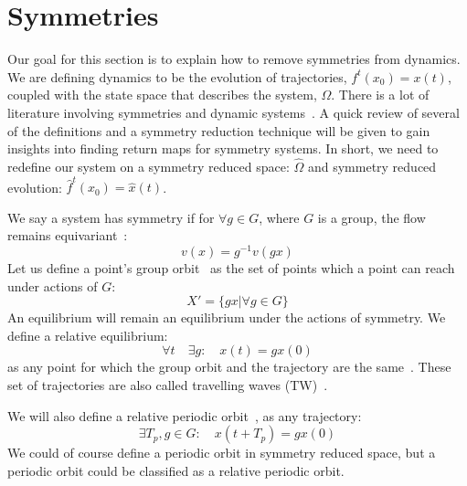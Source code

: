 \documentclass[12 pt]{article}
\begin{document}
\section{Symmetries}
\label{sec:Symm}
Our goal for this section is to explain how to remove symmetries from
dynamics.  We are defining dynamics to be the evolution of trajectories,
$f^{t}(x_0) = x(t)$, coupled with the state space that describes the
system, $\Omega$.  There is a lot of literature involving symmetries and
dynamic systems~\cite{CB, Eth, SliceCond, SRetMap, Atl}.  A quick review
of several of the definitions and a symmetry reduction technique will be
given to gain insights into finding return maps for symmetry systems.  In
short, we need to redefine our system on a symmetry reduced space:
$\hat{\Omega}$ and symmetry reduced evolution: $\hat{f}^{t}(x_0) =
\hat{x}(t)$.

We say a system has symmetry if for $\forall g\in G$, where $G$ is a
group, the flow remains equivariant~\cite{CB}:
\begin{equation}
v(x) = g^{-1}v(gx)
\label{eq:SymmEqui}
\end{equation}
Let us define a point's group orbit~\cite{CB} as the set of points which
a point can reach under actions of $G$:
\begin{equation}
X' = \{gx | \forall g \in G\}
\end{equation}
An equilibrium will remain an equilibrium under the actions of symmetry.
We define a relative equilibrium:
\begin{equation}
\forall t \quad \exists{g}: \quad x(t) = gx(0)
\end{equation}
as any point for which the group orbit and the trajectory are the
same~\cite{CB}.  These set of trajectories are also called travelling
waves (TW)~\cite{CB}.

We will also define a relative periodic orbit~\cite{CB}, as any trajectory:
\begin{equation}
\exists{T_p}, g\in G: \quad  x(t+T_p) = gx(0)
\end{equation}
We could of course define a periodic orbit in symmetry reduced space, but
a periodic orbit could be classified as a relative periodic orbit.
\end{document}
